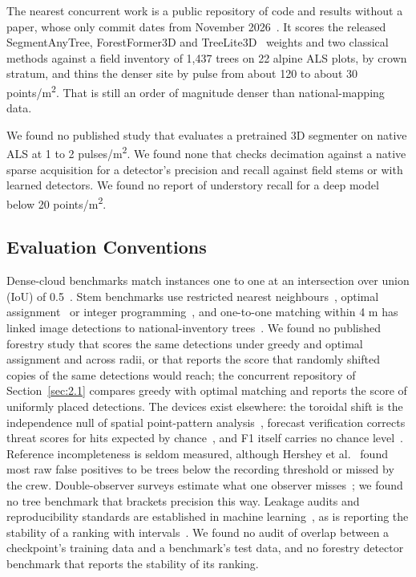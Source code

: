 \documentclass[journal]{IEEEtran}
\begin{document}
The nearest concurrent work is a public repository of code and results without a
paper, whose only commit dates from November 2026~\cite{mallacampoverde2026pretrained}. It scores the released SegmentAnyTree,
ForestFormer3D and TreeLite3D~\cite{rizaldy2026labelefficient} weights and two
classical methods against a field inventory of 1,437 trees on 22 alpine ALS
plots, by crown stratum, and thins the denser site by pulse from about 120 to
about 30 points/m\textsuperscript{2}. That is still an order of magnitude denser than
national-mapping data.

We found no published study that evaluates a pretrained 3D segmenter on native
ALS at 1 to 2 pulses/m\textsuperscript{2}. We found none that checks decimation against a native
sparse acquisition for a detector's precision and recall against field stems or
with learned detectors. We found no report of understory recall for a deep model
below 20 points/m\textsuperscript{2}.

\subsection{Evaluation Conventions}\label{sec:2.2}

Dense-cloud benchmarks match instances one to one at an intersection over union
(IoU) of 0.5~\cite{puliti2023forinstance,xiang2025forestformer3d,ruoppa2026benchmarking}. Stem benchmarks use restricted nearest neighbours~\cite{eysn2015benchmark}, optimal assignment~\cite{hamraz2016robust,kuhn1955hungarian}
or integer programming~\cite{hershey2022voxelbased}, and one-to-one matching within
4 m has linked image detections to national-inventory trees~\cite{gominski2025mining}. We found no published forestry study that scores the same
detections under greedy and optimal assignment and across radii, or that reports
the score that randomly shifted copies of the same detections would reach; the
concurrent repository of Section~\ref{sec:2.1} compares greedy with optimal matching and
reports the score of uniformly placed detections. The devices exist elsewhere:
the toroidal shift is the independence null of spatial point-pattern analysis~\cite{lotwick1982methods,wiegand2004rings}, forecast verification corrects threat
scores for hits expected by chance~\cite{hogan2010equitability}, and F1 itself
carries no chance level~\cite{powers2011evaluation}. Reference incompleteness is
seldom measured, although Hershey et al.~\cite{hershey2022voxelbased} found most raw false positives
to be trees below the recording threshold or missed by the crew. Double-observer
surveys estimate what one observer misses~\cite{nichols2000doubleobserver}; we found
no tree benchmark that brackets precision this way. Leakage audits and
reproducibility standards are established in machine learning~\cite{kapoor2023leakage,heil2021reproducibility}, as is reporting the stability of
a ranking with intervals~\cite{dehghani2021benchmark,agarwal2021deep}. We found no
audit of overlap between a checkpoint's training data and a benchmark's test
data, and no forestry detector benchmark that reports the stability of its
ranking.
\end{document}
